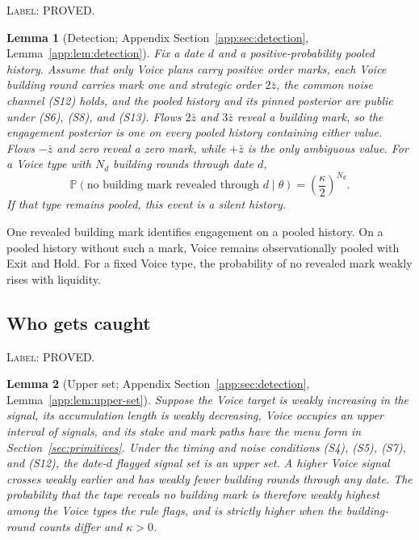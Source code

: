 \documentclass[11pt]{article}
\newtheorem{lemma}{Lemma}
\newcommand{\Prb}{\mathbb{P}}
\begin{document}
\noindent\textsc{Label: PROVED.}\par
\begin{lemma}[Detection; Appendix Section~\ref{app:sec:detection}, Lemma~\ref{app:lem:detection}]
\label{lem:detection}
Fix a date $d$ and a positive-probability pooled history. Assume that only Voice plans carry
positive order marks, each Voice building round carries mark one and strategic order
$2\bar z$, the common noise channel (S12) holds, and the pooled history and its pinned posterior are
public under (S6), (S8), and (S13). Flows $2\bar z$ and $3\bar z$ reveal a building mark, so the
engagement posterior is one on every pooled history containing either value. Flows $-\bar z$ and
zero reveal a zero mark, while $+\bar z$ is the only ambiguous value. For a Voice type with
$N_d$ building rounds through date $d$,
\begin{equation}
\label{eq:detection-silence-main}
\Prb(\text{no building mark revealed through }d\mid\theta)
=\left(\frac{\kappa}{2}\right)^{N_d}.
\end{equation}
If that type remains pooled, this event is a silent history.
\end{lemma}

One revealed building mark identifies engagement on a pooled history. On a pooled history without
such a mark, Voice remains observationally pooled with Exit and Hold. For a fixed Voice type, the
probability of no revealed mark weakly rises with liquidity.

\subsection{Who gets caught}
\label{sec:detection-caught}

\noindent\textsc{Label: PROVED.}\par
\begin{lemma}[Upper set; Appendix Section~\ref{app:sec:detection}, Lemma~\ref{app:lem:upper-set}]
\label{lem:upper-set}
Suppose the Voice target is weakly increasing in the signal, its accumulation length is weakly
decreasing, Voice occupies an upper interval of signals, and its stake and mark paths have the menu
form in Section~\ref{sec:primitives}. Under the timing and noise conditions (S4), (S5), (S7), and
(S12), the date-$d$ flagged signal set is an upper set. A higher Voice signal crosses weakly earlier
and has weakly fewer building rounds through any date. The probability that the tape reveals no
building mark is therefore weakly highest among the Voice types the rule flags, and is strictly
higher when the building-round counts differ and $\kappa>0$.
\end{lemma}
\end{document}

